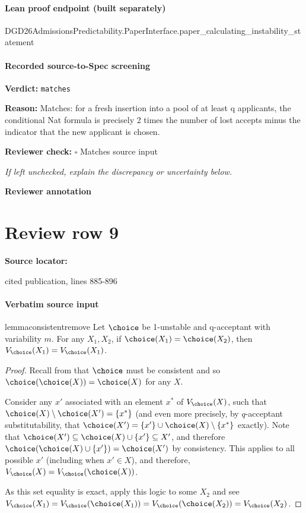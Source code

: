 \documentclass[10pt]{article}
\newcommand{\reviewerbox}{%
  \par\noindent\fbox{\parbox{0.96\linewidth}{\rule{0pt}{0.38in}}}\par
}
\newcommand{\reviewmatch}[1]{%
  \par\noindent\textbf{Reviewer check:} $\square$\; #1\par
  \noindent\emph{If left unchecked, explain the discrepancy or uncertainty below.}\par
}
\begin{document}
\paragraph{Lean proof endpoint (built separately)}\begin{ReviewVerbatim}
DGD26AdmissionsPredictability.PaperInterface.paper_calculating_instability_statement
\end{ReviewVerbatim}

\paragraph{Recorded source-to-Spec screening}
\textbf{Verdict:} \texttt{matches}
\\
{\raggedright
\textbf{Reason:} Matches:\allowbreak{} for a fresh insertion into a pool of at least q applicants, the conditional Nat formula is precisely 2 times the number of lost accepts minus the indicator that the new applicant is chosen.\allowbreak{}
\par}
\reviewmatch{Matches source input}
\noindent\textbf{Reviewer annotation}\par
\reviewerbox
\clearpage
\hypertarget{source-claim-72ba750e0e18812e}{}
\section*{Review row 9}
\textbf{Source locator:} {\footnotesize\raggedright cited publication, lines 885-\allowbreak{}896\par}
\paragraph{Verbatim source input}
\begin{ReviewVerbatim}
\begin{restatable}{lemma}{consistentremove}
\label{lem:consistent-remove}
Let $\choice$ be 1-unstable and q-acceptant with variability $m$. For any $X_1, X_2$, if $\choice(X_1) = \choice(X_2)$, then $V_\choice(X_1) = V_\choice(X_1)$.
\end{restatable}

\begin{proof}
Recall from  that $\choice$ must be consistent and so $\choice(\choice(X)) = \choice(X)$ for any $X$.

Consider any $x'$ associated with an element $x^*$ of $V_\choice(X)$, such that $\choice(X) \setminus \choice(X') = \{x^*\}$ (and even more precisely, by $q$-acceptant substitutability, that $\choice(X') = \{x'\} \cup \choice(X) \setminus \{x^*\}$ exactly). Note that $\choice(X') \subseteq \choice(X) \cup \{x'\} \subseteq X'$, and therefore $\choice(\choice(X) \cup \{x'\}) = \choice(X')$ by consistency. This applies to all possible $x'$ (including when $x' \in X$), and therefore, $V_\choice(X) = V_\choice(\choice(X))$.

As this set equality is exact, apply this logic to some $X_2$ and see $V_\choice(X_1) = V_\choice(\choice(X_1)) = V_\choice(\choice(X_2)) = V_\choice(X_2)$.
\end{proof}
\end{ReviewVerbatim}
\end{document}
